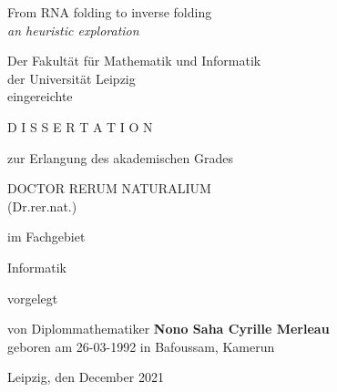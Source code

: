 \thispagestyle{empty}
{\Large
\begin{center}
	From RNA folding to  inverse folding\\
	\textit{an heuristic exploration}
\end{center}}
\vspace*{0.7cm}
\begin{center}
Der Fakult\"at f\"ur Mathematik und Informatik\\
der Universit\"at Leipzig\\
eingereichte
\end{center}
\vspace*{0.7cm}
\begin{center}
D I S S E R T A T I O N
\end{center}
\vspace*{0.7cm}
\begin{center}
zur Erlangung des akademischen Grades
\end{center}

\begin{center}
DOCTOR RERUM NATURALIUM\\
(Dr.rer.nat.)
\end{center}
\vspace*{0.5cm}
\begin{center}
im Fachgebiet 
\end{center}
\begin{center}
Informatik
\end{center}
\begin{center}
vorgelegt 
\end{center}
\vspace*{0.7cm}
\begin{center}
von Diplommathematiker \textbf{Nono Saha Cyrille Merleau}\\
geboren am 26-03-1992 \hspace{0em} in Bafoussam, Kamerun
\end{center}
\vspace{1cm}

\begin{center}
Leipzig, den {December 2021}
\end{center}


